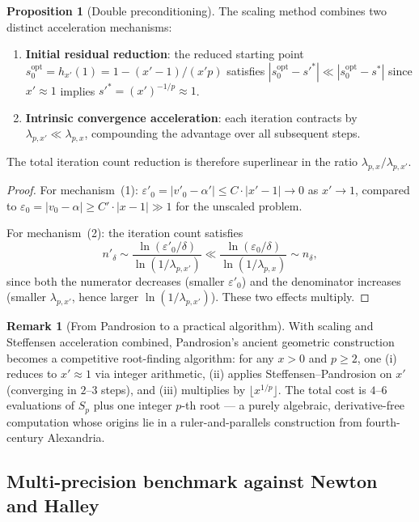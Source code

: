 \documentclass[11pt,a4paper]{article}
\theoremstyle{definition}
\newtheorem{proposition}{Proposition}[section]
\newtheorem{remark}{Remark}[section]
\newcommand{\eps}{\varepsilon}
\begin{document}
\begin{proposition}[Double preconditioning]
\label{prop:preconditioning}
The scaling method combines two distinct acceleration mechanisms:
\begin{enumerate}
  \item \textbf{Initial residual reduction}: the reduced starting point $s_0^{\mathrm{opt}} = h_{x'}(1) = 1 - (x'-1)/(x'p)$ satisfies $|s_0^{\mathrm{opt}} - s'^*| \ll |s_0^{\mathrm{opt}} - s^*|$ since $x' \approx 1$ implies $s'^* = (x')^{-1/p} \approx 1$.
  \item \textbf{Intrinsic convergence acceleration}: each iteration contracts by $\lambda_{p,x'} \ll \lambda_{p,x}$, compounding the advantage over all subsequent steps.
\end{enumerate}
The total iteration count reduction is therefore superlinear in the ratio $\lambda_{p,x}/\lambda_{p,x'}$.
\end{proposition}

\begin{proof}
For mechanism~(1): $\eps'_0 = |v'_0 - \alpha'| \leq C \cdot |x' - 1| \to 0$ as $x' \to 1$, compared to $\eps_0 = |v_0 - \alpha| \geq C' \cdot |x - 1| \gg 1$ for the unscaled problem.

For mechanism~(2): the iteration count satisfies
\[
  n'_\delta \sim \frac{\ln(\eps'_0/\delta)}{\ln(1/\lambda_{p,x'})} \ll \frac{\ln(\eps_0/\delta)}{\ln(1/\lambda_{p,x})} \sim n_\delta,
\]
since both the numerator decreases (smaller $\eps'_0$) and the denominator increases (smaller $\lambda_{p,x'}$, hence larger $\ln(1/\lambda_{p,x'})$). These two effects multiply.
\end{proof}

\begin{remark}[From Pandrosion to a practical algorithm]
With scaling and Steffensen acceleration combined, Pandrosion's ancient geometric construction becomes a competitive root-finding algorithm: for any $x > 0$ and $p \geq 2$, one (i) reduces to $x' \approx 1$ via integer arithmetic, (ii) applies Steffensen--Pandrosion on $x'$ (converging in $2$--$3$ steps), and (iii) multiplies by $\lfloor x^{1/p} \rfloor$. The total cost is $4$--$6$ evaluations of $S_p$ plus one integer $p$-th root --- a purely algebraic, derivative-free computation whose origins lie in a ruler-and-parallels construction from fourth-century Alexandria.
\end{remark}

\subsection{Multi-precision benchmark against Newton and Halley}
\label{sec:benchmark}
\end{document}
